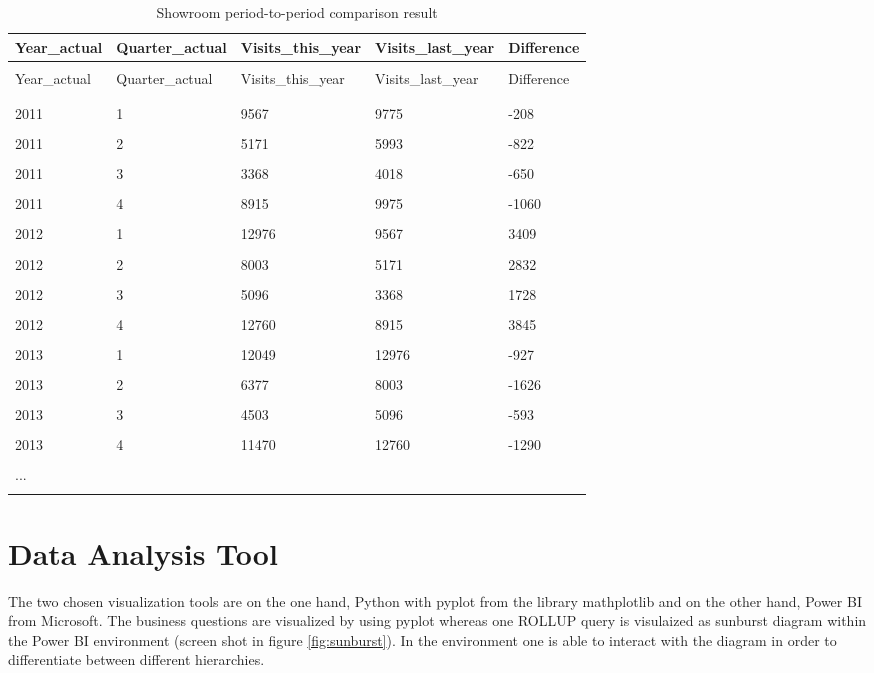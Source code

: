 \documentclass[letterpaper,12pt]{article}
\begin{document}
\begingroup
\renewcommand\arraystretch{0.5}
\begin{longtable}{p{2.5cm}p{3cm}p{3cm}p{3cm}p{2cm}}
        \caption{Showroom period-to-period comparison result} \\
	Year\_actual & Quarter\_actual & Visits\_this\_year & Visits\_last\_year & Difference \\
        \endfirsthead \\
        Year\_actual & Quarter\_actual & Visits\_this\_year & Visits\_last\_year & Difference \\
        \endhead \\
        \hline \\
        2011 & 1 & 9567 & 9775 & -208 \\
\hline \\
2011 & 2 & 5171 & 5993 & -822 \\
\hline \\
2011 & 3 & 3368 & 4018 & -650 \\
\hline \\
2011 & 4 & 8915 & 9975 & -1060 \\
\hline \\
2012 & 1 & 12976 & 9567 & 3409 \\
\hline \\
2012 & 2 & 8003 & 5171 & 2832 \\
\hline \\
2012 & 3 & 5096 & 3368 & 1728 \\
\hline \\
2012 & 4 & 12760 & 8915 & 3845 \\
\hline \\
2013 & 1 & 12049 & 12976 & -927 \\
\hline \\
2013 & 2 & 6377 & 8003 & -1626 \\
\hline \\
2013 & 3 & 4503 & 5096 & -593 \\
\hline \\
2013 & 4 & 11470 & 12760 & -1290 \\
\hline \\

        ... & & & \\
        \hline \\
\end{longtable}
\endgroup

\section{Data Analysis Tool}
The two chosen visualization tools are on the one hand, Python with pyplot from the library mathplotlib and on the other hand, Power BI from Microsoft.
The business questions are visualized by using pyplot whereas one ROLLUP query is visulaized as sunburst diagram within the Power BI environment (screen shot in figure \ref{fig:sunburst}). In the environment one is able to interact with the diagram in order to differentiate between different hierarchies.
\end{document}
